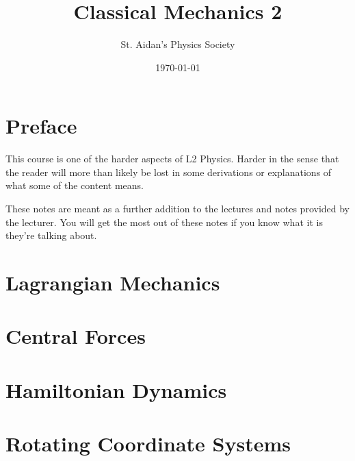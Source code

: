 \documentclass[12pt,%
               a4paper]{physics_notes}
\begin{document}
\title{Classical Mechanics 2}
\author{St. Aidan's Physics Society}
\date{\today}
\maketitle

\tableofcontents
\newpage

\section{Preface}
This course is one of the harder aspects of L2 Physics. Harder in the sense that the reader will more than likely be lost in some derivations or explanations of what some of the content means. \par
These notes are meant as a further addition to the lectures and notes provided by the lecturer. You will get the most out of these notes if you know what it is they're talking about. 


\section{Lagrangian Mechanics}



\section{Central Forces}


\section{Hamiltonian Dynamics}


\section{Rotating Coordinate Systems}


 
\end{document}
